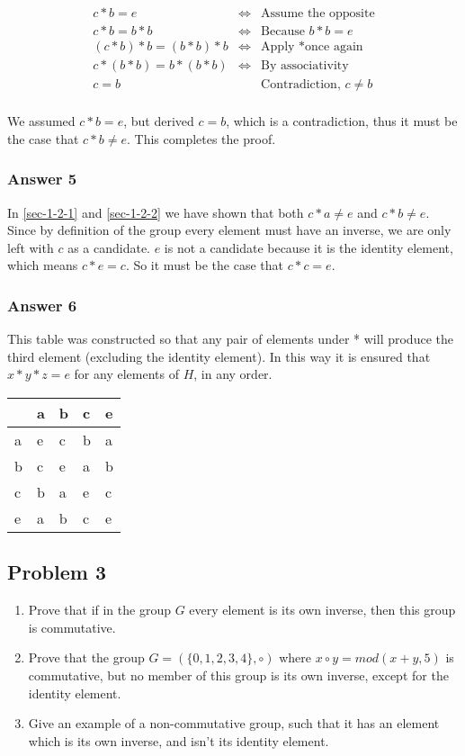 \documentclass[11pt]{article}
\begin{document}
\begin{equation*}
  \begin{array}{lll}
    c*b = e & \iff &
    \textrm{Assume the opposite} \\
    c*b=b*b & \iff &
    \textrm{Because $b*b=e$} \\
    (c*b)*b=(b*b)*b & \iff &
    \textrm{Apply *once again} \\
    c*(b*b)=b*(b*b) & \iff &
    \textrm{By associativity} \\
    c=b &  &
    \textrm{Contradiction, $c \neq b$} \\
  \end{array}
\end{equation*}

We assumed $c*b=e$, but derived $c=b$, which is a contradiction, thus
it must be the case that $c*b \neq e$. This completes the proof.
\subsubsection{Answer 5}
\label{sec-1-2-3}
In \ref{sec-1-2-1} and \ref{sec-1-2-2} we have shown that both $c*a \neq e$ and $c*b \neq e$.
Since by definition of the group every element must have an inverse, we are only
left with $c$ as a candidate.  $e$ is not a candidate because it is the identity
element, which means $c*e=c$.  So it must be the case that $c*c=e$.
\subsubsection{Answer 6}
\label{sec-1-2-4}
This table was constructed so that any pair of elements under * will produce
the third element (excluding the identity element).  In this way it is
ensured that $x * y * z = e$ for any elements of $H$, in any order.

\begin{center}
\begin{tabular}{l|llll}
 & a & b & c & e\\
\hline
a & e & c & b & a\\
b & c & e & a & b\\
c & b & a & e & c\\
e & a & b & c & e\\
\end{tabular}
\end{center}
\subsection{Problem 3}
\label{sec-1-3}
\begin{enumerate}
\item Prove that if in the group $G$ every element is its own inverse, then this
group is commutative.
\item Prove that the group $G = (\{0, 1, 2, 3, 4\}, \circ)$ where 
$x \circ y = mod(x + y, 5)$ is commutative, but no member of this group is
its own inverse, except for the identity element.
\item Give an example of a non-commutative group, such that it has an element 
which is its own inverse, and isn't its identity element.
\end{enumerate}
\end{document}
